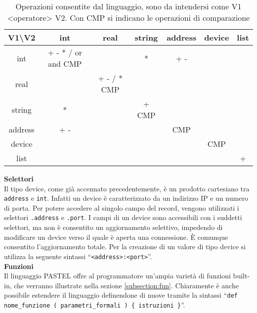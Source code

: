\documentclass[10pt]{article}
\begin{document}
\begin{table}
	\centering
	\begin{tabular}{|c|c|c|c|c|c|c|}
		\hline
		V1\textbackslash V2 &        int         &    real     &  string  & address & device & list \\ \hline
		        int         & + - * / or and CMP &             &    *     &   + -      &        &      \\ \hline
		       real         &                    & + - / * CMP &          &         &        &      \\ \hline
		      string        &         *          &             & +    CMP &         &        &      \\ \hline
		      address       &        + -         &             &          &   CMP   &        &      \\ \hline
		      device        &                    &             &          &         &  CMP   &      \\ \hline
		       list         &                    &             &          &         &        &  +   \\ \hline
	\end{tabular}
	\caption{Operazioni consentite dal linguaggio, sono da intendersi come V1 <operatore> V2. Con CMP si indicano le operazioni di comparazione}
	\label{table:operatori}
\end{table}


\textbf{Selettori}\\
Il tipo device, come già accennato precedentemente, è un prodotto cartesiano tra \texttt{address} e \texttt{int}. Infatti un device è caratterizzato da un indirizzo IP e un numero di porta. Per potere accedere al singolo campo del record, vengono utilizzati i selettori \texttt{.address} e \texttt{.port}. I campi di un device sono accessibili con i suddetti selettori, ma non è consentito un aggiornamento selettivo, impedendo di modificare un device verso il quale è aperta una connessione. È comunque consentito l'aggiornamento totale. Per la creazione di un valore di tipo device si utilizza la seguente sintassi ``\texttt{<address>:<port>}''.\\

\textbf{Funzioni}\\
Il linguaggio PASTEL offre al programmatore un'ampia varietà di funzioni built-in, che verranno illustrate nella sezione \ref{subsection:fun}. Chiaramente è anche possibile estendere il linguaggio definendone di nuove tramite la sintassi ``\texttt{def nome\_funzione ( parametri\_formali ) \{ istruzioni \}}''.
\\
\end{document}
